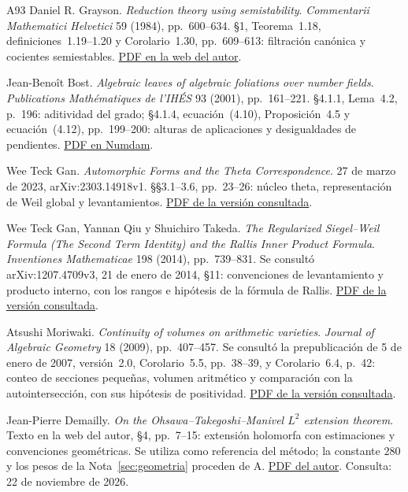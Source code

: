 \begin{thebibliography}{A93}
Daniel R. Grayson. \emph{Reduction theory using semistability}.
\emph{Commentarii Mathematici Helvetici} 59 (1984), pp.~600--634.
§1, Teorema~1.18, definiciones~1.19--1.20 y Corolario~1.30,
pp.~609--613: filtración canónica y cocientes semiestables.
\href{https://www.graysonfamily.org/dan/Papers/ReductionTheoryI.pdf}{PDF en la web del autor}.

Jean-Benoît Bost. \emph{Algebraic leaves of algebraic foliations over
number fields}. \emph{Publications Mathématiques de l'IHÉS} 93 (2001),
pp.~161--221. §4.1.1, Lema~4.2, p.~196: aditividad del grado;
§4.1.4, ecuación~(4.10), Proposición~4.5 y ecuación~(4.12),
pp.~199--200: alturas de aplicaciones y desigualdades de pendientes.
\href{https://www.numdam.org/article/PMIHES_2001__93__161_0.pdf}{PDF en Numdam}.

Wee Teck Gan. \emph{Automorphic Forms and the Theta Correspondence}.
27 de marzo de 2023, arXiv:2303.14918v1.
§§3.1--3.6, pp.~23--26: núcleo theta, representación de Weil global
y levantamientos.
\href{https://arxiv.org/pdf/2303.14918v1}{PDF de la versión consultada}.

Wee Teck Gan, Yannan Qiu y Shuichiro Takeda.
\emph{The Regularized Siegel--Weil Formula (The Second Term Identity)
and the Rallis Inner Product Formula}.
\emph{Inventiones Mathematicae} 198 (2014), pp.~739--831.
Se consultó arXiv:1207.4709v3, 21 de enero de 2014,
§11: convenciones de levantamiento y producto interno, con los
rangos e hipótesis de la fórmula de Rallis.
\href{https://arxiv.org/pdf/1207.4709v3}{PDF de la versión consultada}.

Atsushi Moriwaki.
\emph{Continuity of volumes on arithmetic varieties}.
\emph{Journal of Algebraic Geometry} 18 (2009), pp.~407--457.
Se consultó la prepublicación de 5 de enero de 2007,
versión~2.0, Corolario~5.5, pp.~38--39, y Corolario~6.4,
p.~42: conteo de secciones pequeñas, volumen aritmético
y comparación con la autointersección, con sus hipótesis
de positividad.
\href{https://www.math.kyoto-u.ac.jp/preprint/2007/01moriwaki_ContArVol.pdf}{PDF de la versión consultada}.

Jean-Pierre Demailly.
\emph{On the Ohsawa--Takegoshi--Manivel $L^2$ extension theorem}.
Texto en la web del autor, §4, pp.~7--15:
extensión holomorfa con estimaciones y convenciones geométricas.
Se utiliza como referencia del método; la constante $280$ y
los pesos de la Nota~\ref{sec:geometria} proceden de A.
\href{https://www-fourier.univ-grenoble-alpes.fr/~demailly/source_files/pdf/ohsawa_tak.pdf}{PDF del autor}.
Consulta: 22 de noviembre de 2026.


\end{thebibliography}
